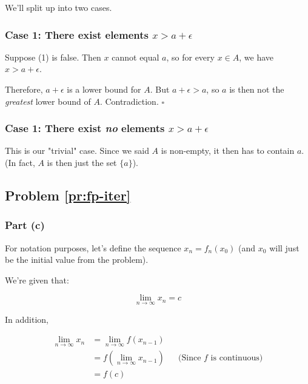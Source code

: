 \vspace{5mm}


We'll split up into two cases.

\subsubsection{Case 1: There exist elements $x > a + \epsilon$}

Suppose (1) is false. Then $x$ cannot equal $a$, so for every $x \in A$, we have $x > a + \epsilon$. 

Therefore, $a + \epsilon$ is a lower bound for $A$. But $a + \epsilon > a$, so $a$ is then not the \textit{greatest} lower bound of $A$. Contradiction. $\square$

\subsubsection{Case 1: There exist \textit{no} elements $x > a + \epsilon$}

This is our "trivial" case. Since we said $A$ is non-empty, it then has to contain $a$. (In fact, $A$ is then just the set $\{a\}$). 


\subsection{Problem \ref{pr:fp-iter}}

\subsubsection{Part (c)}

For notation purposes, let's define the sequence $x_n = f_n(x_0)$ (and $x_0$ will just be the initial value from the problem).

We're given that:

\begin{equation*}
\lim_{n \rightarrow \infty} x_n = c
\end{equation*}

In addition,

\begin{align*}
\lim_{n \rightarrow \infty} x_n &= \lim_{n \rightarrow \infty} f(x_{n-1}) \\
&= f(\lim_{n \rightarrow \infty} x_{n-1}) && \text{(Since $f$ is continuous)} \\
&= f(c) \\
\end{align*}

